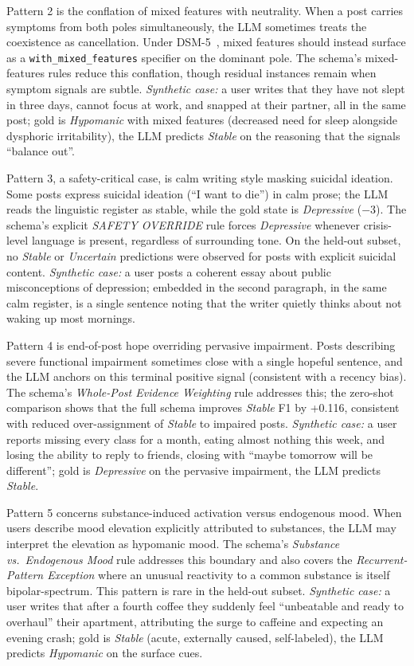 \documentclass[runningheads]{llncs}
\begin{document}
Pattern 2 is the conflation of mixed features with neutrality. When a post carries symptoms from both poles simultaneously, the LLM sometimes treats the coexistence as cancellation. Under DSM-5~\cite{apa2013dsm5}, mixed features should instead surface as a \texttt{with\_mixed\_features} specifier on the dominant pole. The schema's mixed-features rules reduce this conflation, though residual instances remain when symptom signals are subtle. \emph{Synthetic case:} a user writes that they have not slept in three days, cannot focus at work, and snapped at their partner, all in the same post; gold is \emph{Hypomanic} with mixed features (decreased need for sleep alongside dysphoric irritability), the LLM predicts \emph{Stable} on the reasoning that the signals ``balance out''.

Pattern 3, a safety-critical case, is calm writing style masking suicidal ideation. Some posts express suicidal ideation (``I want to die'') in calm prose; the LLM reads the linguistic register as stable, while the gold state is \emph{Depressive} ($-3$). The schema's explicit \emph{SAFETY OVERRIDE} rule forces \emph{Depressive} whenever crisis-level language is present, regardless of surrounding tone. On the held-out subset, no \emph{Stable} or \emph{Uncertain} predictions were observed for posts with explicit suicidal content. \emph{Synthetic case:} a user posts a coherent essay about public misconceptions of depression; embedded in the second paragraph, in the same calm register, is a single sentence noting that the writer quietly thinks about not waking up most mornings.

Pattern 4 is end-of-post hope overriding pervasive impairment. Posts describing severe functional impairment sometimes close with a single hopeful sentence, and the LLM anchors on this terminal positive signal (consistent with a recency bias). The schema's \emph{Whole-Post Evidence Weighting} rule addresses this; the zero-shot comparison shows that the full schema improves \emph{Stable} F1 by +0.116, consistent with reduced over-assignment of \emph{Stable} to impaired posts. \emph{Synthetic case:} a user reports missing every class for a month, eating almost nothing this week, and losing the ability to reply to friends, closing with ``maybe tomorrow will be different''; gold is \emph{Depressive} on the pervasive impairment, the LLM predicts \emph{Stable}.

Pattern 5 concerns substance-induced activation versus endogenous mood. When users describe mood elevation explicitly attributed to substances, the LLM may interpret the elevation as hypomanic mood. The schema's \emph{Substance vs.~Endogenous Mood} rule addresses this boundary and also covers the \emph{Recurrent-Pattern Exception} where an unusual reactivity to a common substance is itself bipolar-spectrum. This pattern is rare in the held-out subset. \emph{Synthetic case:} a user writes that after a fourth coffee they suddenly feel ``unbeatable and ready to overhaul'' their apartment, attributing the surge to caffeine and expecting an evening crash; gold is \emph{Stable} (acute, externally caused, self-labeled), the LLM predicts \emph{Hypomanic} on the surface cues.
\end{document}
